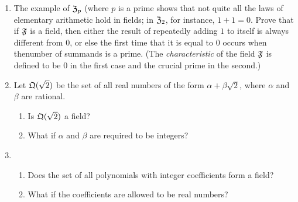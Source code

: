 {\begin{enumerate}[wide]
    set of all positive integers less than \(m\), \(\Integers_m = \{0, 1,
    \,\cdot\,\cdot\,\cdot\,, m - 1\}\). If \(\alpha\) and \(\beta\) are in \(\Integers_m\), let
    \(\alpha + \beta\) be the least positive remainder obtained by dividing the
    (ordinary) sum of \(\alpha\) and \(\beta\) by \(m\), and, similarly, let
    \(\alpha\beta\) be the least positive remainder obtained by dividing the
    (ordinary) product of \(\alpha\) and \(\beta\) by \(m\). (Example: if \(m =
    12\), then \(3 + 11 = 2\) and \(3 \cdot 11 = 9\).)
    \begin{enumerate}[label=(\alph*), wide, nosep]
        \item Prove that \(\Integers_m\) is a field if and only if \(m\) is
        prime.
        \item What is \(-1\) in \(\Integers_5\)?
        \item What is \(\frac{1}{3}\) in \(\Integers_7\)?
    \end{enumerate}
    \item The example of \(\mathfrak{Z}_p\) (where \(p\) is a prime shows that not
    quite all the laws of elementary arithmetic hold in fields; in
    \(\mathfrak{Z}_2\), for instance, \(1 + 1 = 0\). Prove that if \(\mathfrak{F}\) is a
    field, then either the result of repeatedly adding \(1\) to itself is always
    different from \(0\), or else the first time that it is equal to \(0\)
    occurs when thenumber of summands is a prime. (The \emph{characteristic} of
    the field \(\mathfrak{F}\) is defined to be \(0\) in the first case and the
    crucial prime in the second.)
    \item Let \(\mathfrak{Q}(\sqrt{2})\) be the set of all real numbers of the
    form \(\alpha + \beta \sqrt{2}\), where \(\alpha\) and \(\beta\) are
    rational.
    \begin{enumerate}[label=(\alph*), wide, nosep]
        \item Is \(\mathfrak{Q}(\sqrt{2})\) a field?
        \item What if \(\alpha\) and \(\beta\) are required to be integers?
    \end{enumerate}
    \item \begin{enumerate}[label=(\alph*), wide, nosep]
        \item Does the set of all polynomials with integer coefficients form a field?
        \item What if the coefficients are allowed to be real numbers?
    \end{enumerate}

\end{enumerate}}
